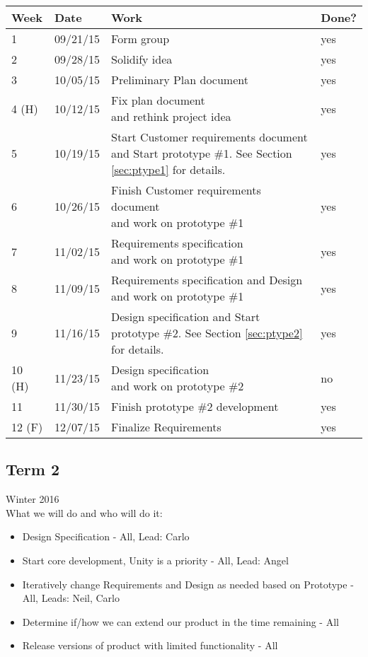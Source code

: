 \begin{table}[H]
\centering
\begin{tabular}{|l|l|l|l|}
\hline
Week 	& Date	 		& Work	 		& 	Done?	 \\ \hline
1		& 09/21/15	 	& Form group		& 	yes		 \\ \hline
2		& 09/28/15	 	& Solidify idea	& 	yes		 \\ \hline
3		& 10/05/15	 	& Preliminary Plan document	& 	yes		 \\ \hline
4 (H)	& 10/12/15	 	& \specialcell{Fix plan document \\ and rethink project idea}	& 			yes \\ \hline
5		& 10/19/15	 	& \specialcell{Start Customer requirements document \\ and Start prototype \#1. See Section \ref{sec:ptype1} for details.}		& 	yes		 \\ \hline
6		& 10/26/15	 	& \specialcell{Finish Customer requirements document \\ and work on prototype \#1}		& 	yes		 \\ \hline	
7		& 11/02/15	 	& \specialcell{Requirements specification \\ and work on prototype \#1} & 	yes		 \\ \hline
8		& 11/09/15	 	& \specialcell{Requirements specification and Design \\and work on prototype \#1}		& 	yes	 \\ \hline
9		& 11/16/15	 	& \specialcell{Design specification and Start \\ prototype \#2. See Section \ref{sec:ptype2} for details.}		& 	yes		 \\ \hline
10 (H)	& 11/23/15	 	& \specialcell{Design specification \\ and work on prototype \#2}		& no		 \\ \hline
11		& 11/30/15	 	& Finish prototype \#2 development	& 		yes	 \\ \hline
12 (F)	& 12/07/15	 	& Finalize Requirements		& 	yes		 \\ \hline
\end{tabular}
\end{table}

\subsection{Term 2}
Winter 2016 \\
What we will do and who will do it:
\begin{itemize}
	\item Design Specification - All, Lead: Carlo
	\item Start core development, Unity is a priority - All, Lead: Angel
	\item Iteratively change Requirements and Design as needed based on Prototype - All, Leads: Neil, Carlo
	\item Determine if/how we can extend our product in the time remaining - All
	\item Release versions of product with limited functionality - All
\end{itemize}

